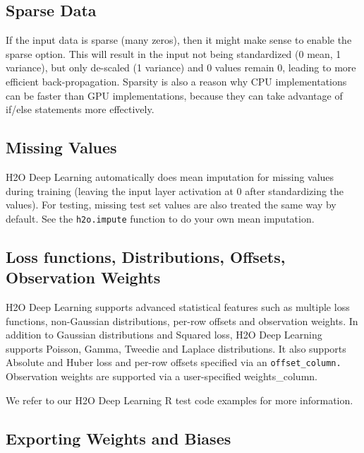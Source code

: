 \documentclass[]{book}
\begin{document}
\hypertarget{sparse-data}{%
\subsection{Sparse Data}\label{sparse-data}}

If the input data is sparse (many zeros), then it might make sense to enable the sparse option. This will result in the input not being standardized (0 mean, 1 variance), but only de-scaled (1 variance) and 0 values remain 0, leading to more efficient back-propagation. Sparsity is also a reason why CPU implementations can be faster than GPU implementations, because they can take advantage of if/else statements more effectively.

\hypertarget{missing-values}{%
\subsection{Missing Values}\label{missing-values}}

H2O Deep Learning automatically does mean imputation for missing values during training (leaving the input layer activation at 0 after standardizing the values). For testing, missing test set values are also treated the same way by default. See the \texttt{h2o.impute} function to do your own mean imputation.

\hypertarget{loss-functions-distributions-offsets-observation-weights}{%
\subsection{Loss functions, Distributions, Offsets, Observation Weights}\label{loss-functions-distributions-offsets-observation-weights}}

H2O Deep Learning supports advanced statistical features such as multiple loss functions, non-Gaussian distributions, per-row offsets and observation weights. In addition to Gaussian distributions and Squared loss, H2O Deep Learning supports Poisson, Gamma, Tweedie and Laplace distributions. It also supports Absolute and Huber loss and per-row offsets specified via an \texttt{offset\_column.} Observation weights are supported via a user-specified weights\_column.

We refer to our H2O Deep Learning R test code examples for more information.

\hypertarget{exporting-weights-and-biases}{%
\subsection{Exporting Weights and Biases}\label{exporting-weights-and-biases}}
\end{document}
